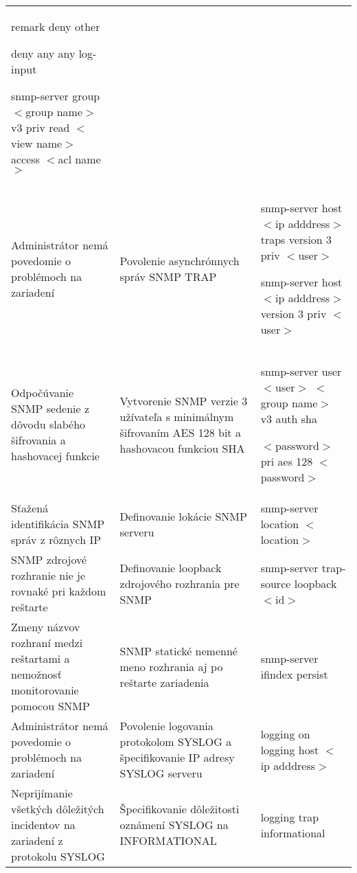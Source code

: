 \begin{longtable}[!htbp]{|L{10em}L{10em}>{\selectfont}L{34em}|}
	\hspace{0.5em}remark deny other
	
	\hspace{0.5em}deny any any log-input
	
	snmp-server group $<$group name$>$ v3 priv read $<$view name$>$  access $<$acl name$>$\\
	
	
	
	
	Administrátor nemá povedomie o problémoch na zariadení	&Povolenie asynchrónnych správ SNMP TRAP	&snmp-server host $<$ip adddress$>$ traps version 3 priv $<$user$>$
	
	snmp-server host $<$ip adddress$>$ version 3 priv $<$user$>$\\
	
	
	
	
	 Odpočúvanie SNMP sedenie z dôvodu slabého šifrovania a hashovacej  funkcie	&Vytvorenie SNMP verzie 3 užívateľa s minimálnym šifrovaním AES 128 bit a hashovacou funkciou SHA	&snmp-server user $<$user$>$ $<$group name$>$ v3 auth sha 
	
	\hspace{0.5em}$<$password$>$ pri aes 128 $<$password$>$\\
	
	
	
	
	Sťažená identifikácia SNMP správ z rôznych IP	&Definovanie lokácie SNMP serveru	&snmp-server location $<$location$>$\\
	
	
	
	
	 SNMP zdrojové rozhranie nie je rovnaké pri každom reštarte	& Definovanie loopback zdrojového rozhrania pre SNMP	&snmp-server trap-source loopback $<$id$>$\\
	
	
	
	
	Zmeny názvov rozhraní medzi reštartami a nemožnosť monitorovanie pomocou SNMP	&SNMP statické nemenné meno rozhrania aj po reštarte zariadenia	&snmp-server ifindex persist\\
	
	
	
	
	 Administrátor nemá povedomie o problémoch na zariadení	&Povolenie logovania protokolom SYSLOG a špecifikovanie IP adresy SYSLOG serveru	&logging on
	logging host $<$ip adddress$>$\\
	
	
	
	
	Neprijímanie všetkých dôležitých incidentov na zariadení z protokolu SYSLOG	&Špecifikovanie dôležitosti oznámení SYSLOG na INFORMATIONAL	&logging trap informational\\
	

\end{longtable}
